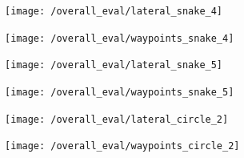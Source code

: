 \documentclass[titlepage,draft]{article}
\begin{document}
{\begin{figure}[H]
	\centering
	\begin{minipage}{.45\textwidth}
		\centering
		\texttt{[image: /overall\_eval/lateral\_snake\_4]}
		\label{fig:snake_lat_4}
	\end{minipage}%
	\hspace{0.1\textwidth}%
	\begin{minipage}{.45\textwidth}
		\centering
		\texttt{[image: /overall\_eval/waypoints\_snake\_4]}
		\label{fig:snake_way_4}
	\end{minipage}
\end{figure}

\begin{figure}[H]
	\centering
	\begin{minipage}{.45\textwidth}
		\centering
		\texttt{[image: /overall\_eval/lateral\_snake\_5]}
		\label{fig:snake_lat_5}
	\end{minipage}%
	\hspace{0.1\textwidth}%
	\begin{minipage}{.45\textwidth}
		\centering
		\texttt{[image: /overall\_eval/waypoints\_snake\_5]}
		\label{fig:snake_way_5}
	\end{minipage}
\end{figure}








\begin{figure}[H]
	\centering
	\begin{minipage}{.45\textwidth}
		\centering
		\texttt{[image: /overall\_eval/lateral\_circle\_2]}
		\label{fig:circle_lat_2}
	\end{minipage}%
	\hspace{0.1\textwidth}%
	\begin{minipage}{.45\textwidth}
		\centering
		\texttt{[image: /overall\_eval/waypoints\_circle\_2]}
		\label{fig:circle_way_2}
	\end{minipage}
\end{figure}

}
\end{document}
